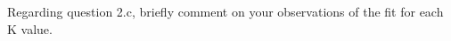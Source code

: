 \item {}

Regarding question 2.c, briefly comment on your observations of the fit for each K value.
